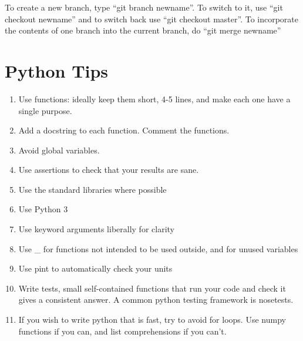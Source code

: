 \documentclass[12pt]{article}
\begin{document}
To create a new branch, type ``git branch newname''. To switch to it, use ``git checkout newname'' and to switch back use ``git checkout master''. To incorporate the contents of one branch into the current branch, do ``git merge newname''

\section{Python Tips}

\begin{enumerate}
 \item Use functions: ideally keep them short, 4-5 lines, and make each one have a single purpose.
 \item Add a docstring to each function. Comment the functions.
 \item Avoid global variables.
 \item Use assertions to check that your results are sane.
 \item Use the standard libraries where possible
 \item Use Python 3
 \item Use keyword arguments liberally for clarity
 \item Use \_ for functions not intended to be used outside, and for unused variables
 \item Use pint to automatically check your units
 \item Write tests, small self-contained functions that run your code and check it gives a consistent answer. A common python testing framework is nosetests.
 \item If you wish to write python that is fast, try to avoid for loops. Use numpy functions if you can, and list comprehensions if you can't.
\end{enumerate}
\end{document}
